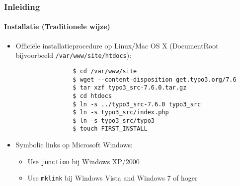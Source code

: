 \begin{frame}[fragile]
	\frametitle{Inleiding}
	\framesubtitle{Installatie (Traditionele wijze)}

	\begin{itemize}
		\item Officiële installatieprocedure op Linux/Mac OS X\newline
			(DocumentRoot bijvoorbeeld \texttt{/var/www/site/htdocs}):

			\begin{lstlisting}
				$ cd /var/www/site
				$ wget --content-disposition get.typo3.org/7.6
				$ tar xzf typo3_src-7.6.0.tar.gz
				$ cd htdocs
				$ ln -s ../typo3_src-7.6.0 typo3_src
				$ ln -s typo3_src/index.php
				$ ln -s typo3_src/typo3
				$ touch FIRST_INSTALL
			\end{lstlisting}

		\item Symbolic links op Microsoft Windows:

			\begin{itemize}
				\item Use \texttt{junction} bij Windows XP/2000
				\item Use \texttt{mklink} bij Windows Vista and Windows 7 of hoger
			\end{itemize}

	\end{itemize}
\end{frame}

